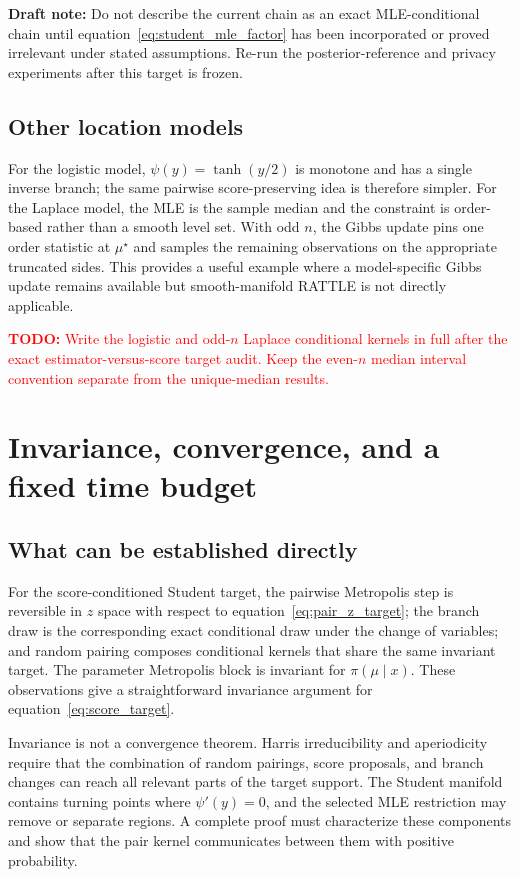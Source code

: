 \documentclass[smallextended,natbib,runningheads]{svjour3}
\newcommand{\todo}[1]{\textcolor{red}{\textbf{TODO:} #1}}
\newcommand{\draftnote}[1]{\textcolor{blue!70!black}{\textbf{Draft note:} #1}}
\begin{document}
\draftnote{Do not describe the current chain as an exact MLE-conditional chain
until equation~\eqref{eq:student_mle_factor} has been incorporated or proved
irrelevant under stated assumptions.  Re-run the posterior-reference and
privacy experiments after this target is frozen.}

\subsection{Other location models}

For the logistic model, $\psi(y)=\tanh(y/2)$ is monotone and has a single
inverse branch; the same pairwise score-preserving idea is therefore simpler.
For the Laplace model, the MLE is the sample median and the constraint is
order-based rather than a smooth level set.  With odd $n$, the Gibbs update
pins one order statistic at $\mu^\star$ and samples the remaining observations
on the appropriate truncated sides.  This provides a useful example where a
model-specific Gibbs update remains available but smooth-manifold RATTLE is
not directly applicable.

\todo{Write the logistic and odd-$n$ Laplace conditional kernels in full after
the exact estimator-versus-score target audit.  Keep the even-$n$ median
interval convention separate from the unique-median results.}

\section{Invariance, convergence, and a fixed time budget}
\label{sec:convergence}

\subsection{What can be established directly}

For the score-conditioned Student target, the pairwise Metropolis step is
reversible in $z$ space with respect to
equation~\eqref{eq:pair_z_target}; the branch draw is the corresponding exact
conditional draw under the change of variables; and random pairing composes
conditional kernels that share the same invariant target.  The parameter
Metropolis block is invariant for $\pi(\mu\mid x)$.  These observations give a
straightforward invariance argument for equation~\eqref{eq:score_target}.

Invariance is not a convergence theorem.  Harris irreducibility and
aperiodicity require that the combination of random pairings, score proposals,
and branch changes can reach all relevant parts of the target support.  The
Student manifold contains turning points where $\psi'(y)=0$, and the selected
MLE restriction may remove or separate regions.  A complete proof must
characterize these components and show that the pair kernel communicates
between them with positive probability.
\end{document}
